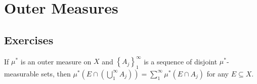 \newpage

\section{Outer Measures}

\subsection*{Exercises}

\begin{exercise}
    If \( \mu^{\ast} \) is an outer measure on \( X \) and \( {\left\{ A_{j} \right\}}_{1}^{\infty} \) is a sequence of disjoint \( \mu^{\ast} \)-measurable sets, then \( \mu^{\ast}\left( E \cap \left( \bigcup_{1}^{\infty} A_{j} \right) \right) = \sum_{1}^{\infty} \mu^{\ast}(E \cap A_{j}) \) for any \( E \subseteq X \).
\end{exercise}

